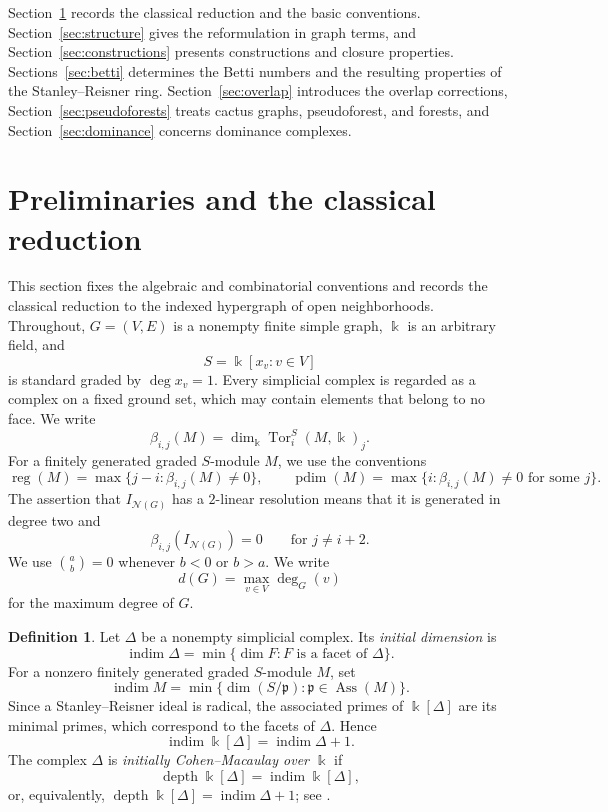 \documentclass[11pt]{amsart}
\theoremstyle{definition}
\newtheorem{definition}[theorem]{Definition}
\theoremstyle{remark}
\numberwithin{equation}{section}
\newcommand{\NN}{\mathcal N}
\newcommand{\pd}{\operatorname{pdim}}
\newcommand{\depth}{\operatorname{depth}}
\newcommand{\reg}{\operatorname{reg}}
\begin{document}
	Section~\ref{sec:background} records the classical reduction and the basic
	conventions. Section~\ref{sec:structure} gives the reformulation in graph
	terms, and Section~\ref{sec:constructions} presents constructions and
	closure properties. Sections~\ref{sec:betti} determines the Betti numbers and
	the resulting properties of the Stanley--Reisner ring. Section~\ref{sec:overlap}
	introduces the overlap corrections, Section~\ref{sec:pseudoforests} treats
	cactus graphs, pseudoforest, and forests, and Section~\ref{sec:dominance} concerns dominance complexes.

\section{Preliminaries and the classical reduction}\label{sec:background}
	
	This section fixes the algebraic and combinatorial conventions and records the
	classical reduction to the indexed hypergraph of open neighborhoods.
	Throughout, \(G=(V,E)\) is a
	nonempty finite simple graph, \(\Bbbk\) is an arbitrary field, and
	\[
	S=\Bbbk[x_v:v\in V]
	\]
	is standard graded by \(\deg x_v=1\). Every simplicial complex is regarded as
	a complex on a fixed ground set, which may contain elements that belong to no
	face. We write
	\[
	\beta_{i,j}(M)=\dim_{\Bbbk}\operatorname{Tor}_i^S(M,\Bbbk)_j.
	\]
	For a finitely generated graded \(S\)-module \(M\), we use the conventions
	\[
	\reg(M)=\max\{j-i:\beta_{i,j}(M)\ne0\},
	\qquad
	\pd(M)=\max\{i:\beta_{i,j}(M)\ne0\text{ for some }j\}.
	\]
	The assertion that \(I_{\NN(G)}\) has a \(2\)-linear resolution means that
	it is generated in degree two and
	\[
	\beta_{i,j}(I_{\NN(G)})=0
	\qquad\text{for }j\ne i+2.
	\]
	We use \(\binom ab=0\) whenever \(b<0\) or \(b>a\).
	We write
	\[
	d(G)=\max_{v\in V}\deg_G(v)
	\]
	for the maximum degree of \(G\).
	
	\begin{definition}
		Let \(\Delta\) be a nonempty simplicial complex. Its \emph{initial
			dimension} is
		\[
		\operatorname{indim}\Delta
		=
		\min\{\dim F:F\text{ is a facet of }\Delta\}.
		\]
		For a nonzero finitely generated graded \(S\)-module \(M\), set
		\[
		\operatorname{indim} M
		=
		\min\{\dim(S/\mathfrak p):\mathfrak p\in\operatorname{Ass}(M)\}.
		\]
		Since a Stanley--Reisner ideal is radical, the associated primes of
		\(\Bbbk[\Delta]\) are its minimal primes, which correspond to the facets
		of \(\Delta\). Hence
		\[
		\operatorname{indim}\Bbbk[\Delta]
		=
		\operatorname{indim}\Delta+1.
		\]
		The complex \(\Delta\) is \emph{initially Cohen--Macaulay over
			\(\Bbbk\)} if
		\[
		\depth\Bbbk[\Delta]
		=
		\operatorname{indim}\Bbbk[\Delta],
		\]
		or, equivalently,
		\(\depth\Bbbk[\Delta]=\operatorname{indim}\Delta+1\);
		see \cite{NamiqInitiallyCM}.
	\end{definition}
	
\end{document}
